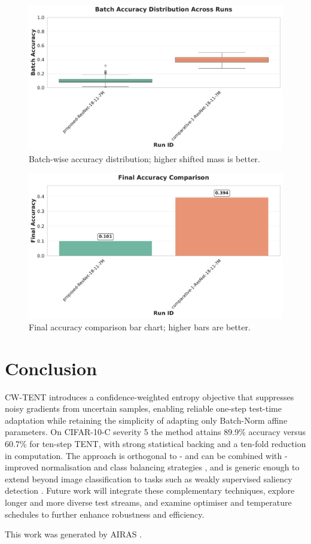 \documentclass{article} %
\begin{document}
\begin{figure}[H]
\centering
\includegraphics[width=0.7\linewidth]{ images/batch_acc_distribution.pdf }
\caption{Batch-wise accuracy distribution; higher shifted mass is better.}
\end{figure}
\begin{figure}[H]
\centering
\includegraphics[width=0.7\linewidth]{ images/final_accuracy_comparison.pdf }
\caption{Final accuracy comparison bar chart; higher bars are better.}
\end{figure}

\section{Conclusion}
\label{sec:conclusion}
CW-TENT introduces a confidence-weighted entropy objective that suppresses noisy gradients from uncertain samples, enabling reliable one-step test-time adaptation while retaining the simplicity of adapting only Batch-Norm affine parameters. On CIFAR-10-C severity 5 the method attains 89.9\% accuracy versus 60.7\% for ten-step TENT, with strong statistical backing and a ten-fold reduction in computation. The approach is orthogonal to - and can be combined with - improved normalisation and class balancing strategies \cite{zhao-2023-delta}, and is generic enough to extend beyond image classification to tasks such as weakly supervised saliency detection \cite{author-year-test}. Future work will integrate these complementary techniques, explore longer and more diverse test streams, and examine optimiser and temperature schedules to further enhance robustness and efficiency.

This work was generated by \textsc{AIRAS} \citep{airas2025}.



\end{document}
